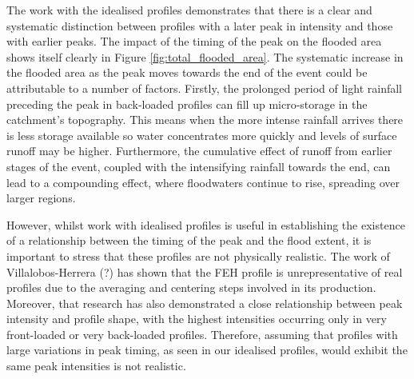 \documentclass[APA,Times2COL]{WileyNJDv5}
\begin{document}

The work with the idealised profiles demonstrates that there is a clear and systematic distinction between profiles with a later peak in intensity and those with earlier peaks. The impact of the timing of the peak on the flooded area shows itself clearly in Figure \ref{fig:total_flooded_area}. The systematic increase in the flooded area as the peak moves towards the end of the event could be attributable to a number of factors. Firstly, the prolonged period of light rainfall preceding the peak in back-loaded profiles can fill up micro-storage in the catchment's topography. This means when the more intense rainfall arrives there is less storage available so water concentrates more quickly and levels of surface runoff may be higher. Furthermore, the cumulative effect of runoff from earlier stages of the event, coupled with the intensifying rainfall towards the end, can lead to a compounding effect, where floodwaters continue to rise, spreading over larger regions. 



However, whilst work with idealised profiles is useful in establishing the existence of a relationship between the timing of the peak and the flood extent, it is important to stress that these profiles are not physically realistic. The work of Villalobos-Herrera (?) has shown that the FEH profile is unrepresentative of real profiles due to the averaging and centering steps involved in its production. Moreover, that research has also demonstrated a close relationship between peak intensity and profile shape, with the highest intensities occurring only in very front-loaded or very back-loaded profiles. Therefore, assuming that profiles with large variations in peak timing, as seen in our idealised profiles, would exhibit the same peak intensities is not realistic.
\end{document}
